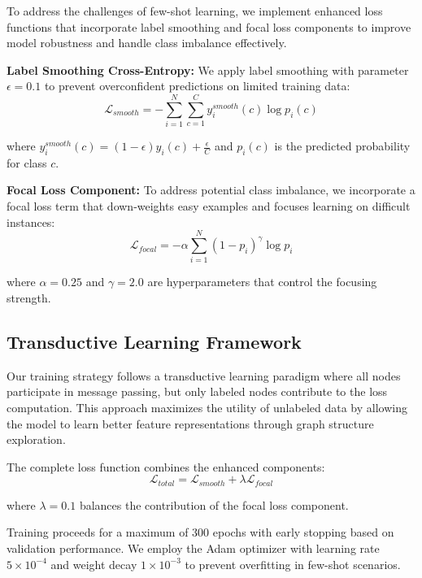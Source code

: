 To address the challenges of few-shot learning, we implement enhanced loss functions that incorporate label smoothing and focal loss components to improve model robustness and handle class imbalance effectively.

\textbf{Label Smoothing Cross-Entropy:} We apply label smoothing with parameter $\epsilon = 0.1$ to prevent overconfident predictions on limited training data:
\begin{equation}
\mathcal{L}_{smooth} = -\sum_{i=1}^{N} \sum_{c=1}^{C} y_i^{smooth}(c) \log p_i(c)
\end{equation}

where $y_i^{smooth}(c) = (1-\epsilon)y_i(c) + \frac{\epsilon}{C}$ and $p_i(c)$ is the predicted probability for class $c$.

\textbf{Focal Loss Component:} To address potential class imbalance, we incorporate a focal loss term that down-weights easy examples and focuses learning on difficult instances:
\begin{equation}
\mathcal{L}_{focal} = -\alpha \sum_{i=1}^{N} (1-p_i)^{\gamma} \log p_i
\end{equation}

where $\alpha = 0.25$ and $\gamma = 2.0$ are hyperparameters that control the focusing strength.

\subsection{Transductive Learning Framework}

Our training strategy follows a transductive learning paradigm where all nodes participate in message passing, but only labeled nodes contribute to the loss computation. This approach maximizes the utility of unlabeled data by allowing the model to learn better feature representations through graph structure exploration.

The complete loss function combines the enhanced components:
\begin{equation}
\mathcal{L}_{total} = \mathcal{L}_{smooth} + \lambda \mathcal{L}_{focal}
\end{equation}

where $\lambda = 0.1$ balances the contribution of the focal loss component.

Training proceeds for a maximum of 300 epochs with early stopping based on validation performance. We employ the Adam optimizer with learning rate $5 \times 10^{-4}$ and weight decay $1 \times 10^{-3}$ to prevent overfitting in few-shot scenarios.

\EndChapter
